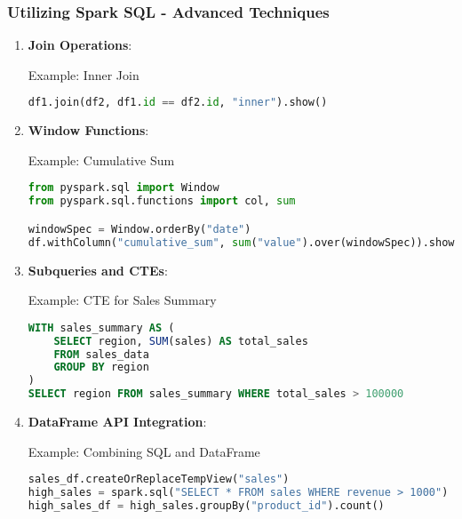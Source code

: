 \documentclass[aspectratio=169]{beamer}
\begin{document}
\begin{frame}[fragile]
    \frametitle{Utilizing Spark SQL - Advanced Techniques}
    \begin{enumerate}
        \item \textbf{Join Operations}:
        \begin{block}{Example: Inner Join}
        \begin{lstlisting}[language=Python]
df1.join(df2, df1.id == df2.id, "inner").show()
        \end{lstlisting}
        \end{block}

        \item \textbf{Window Functions}:
        \begin{block}{Example: Cumulative Sum}
        \begin{lstlisting}[language=Python]
from pyspark.sql import Window
from pyspark.sql.functions import col, sum

windowSpec = Window.orderBy("date")
df.withColumn("cumulative_sum", sum("value").over(windowSpec)).show()
        \end{lstlisting}
        \end{block}

        \item \textbf{Subqueries and CTEs}:
        \begin{block}{Example: CTE for Sales Summary}
        \begin{lstlisting}[language=SQL]
WITH sales_summary AS (
    SELECT region, SUM(sales) AS total_sales
    FROM sales_data
    GROUP BY region
)
SELECT region FROM sales_summary WHERE total_sales > 100000
        \end{lstlisting}
        \end{block}

        \item \textbf{DataFrame API Integration}:
        \begin{block}{Example: Combining SQL and DataFrame}
        \begin{lstlisting}[language=Python]
sales_df.createOrReplaceTempView("sales")
high_sales = spark.sql("SELECT * FROM sales WHERE revenue > 1000")
high_sales_df = high_sales.groupBy("product_id").count()
        \end{lstlisting}
        \end{block}
    \end{enumerate}
\end{frame}
\end{document}
